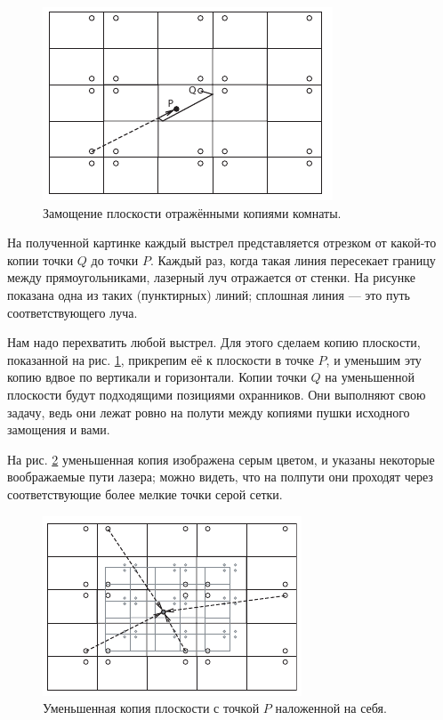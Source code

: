 \begin{figure}[b!]
\centering
\includegraphics[scale=1]{pics/room1}
\caption{Замощение плоскости отражёнными копиями комнаты.}
\label{pic:room1}
\end{figure}

На полученной картинке каждый выстрел представляется отрезком от какой-то копии точки $Q$ до точки $P$.
Каждый раз, когда такая линия пересекает границу между прямоугольниками, лазерный луч отражается от стенки.
На рисунке показана одна из таких (пунктирных) линий; сплошная линия --- это путь соответствующего луча.

Нам надо перехватить любой выстрел.
Для этого сделаем копию плоскости, показанной на рис. \ref{pic:room1}, прикрепим её к плоскости в точке $P$, и уменьшим эту копию вдвое по вертикали и горизонтали.
Копии точки $Q$ на уменьшенной плоскости будут подходящими позициями охранников.
Они выполняют свою задачу, ведь они лежат ровно на полути между копиями пушки исходного замощения и вами.

На рис. \ref{pic:room2} уменьшенная копия изображена серым цветом, и указаны некоторые воображаемые пути лазера; можно видеть, что на полпути они проходят через соответствующие более мелкие точки серой сетки.

\begin{figure}[t!]
\centering
\includegraphics[scale=1]{pics/room2}
\caption{Уменьшенная копия плоскости с точкой $P$ наложенной на себя.}
\label{pic:room2}
\end{figure}

